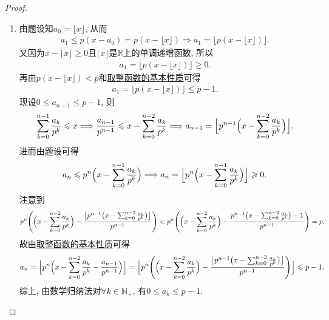 \documentclass[../../main.tex]{subfiles}%
\begin{document}
\begin{proof}
\begin{enumerate}[(1)]
\item 由题设知$a_0=\lfloor x \rfloor$, 从而
\begin{align*}
a_1\leqslant p\left( x-a_0 \right) =p\left( x-\lfloor x \rfloor \right) \Longrightarrow a_1=\lfloor p\left( x-\lfloor x \rfloor \right) \rfloor .
\end{align*}
又因为$x-\lfloor x \rfloor \geqslant 0$且$\lfloor x \rfloor$是$\mathbb{R}$上的单调递增函数, 所以
\begin{align*}
a_1=\lfloor p\left( x-\lfloor x \rfloor \right) \rfloor \geqslant 0.
\end{align*}
再由$p\left( x-\lfloor x \rfloor \right) <p$和\hyperref[proposition:取整函数的基本性质]{取整函数的基本性质}可得
\begin{align*}
a_1=\lfloor p\left( x-\lfloor x \rfloor \right) \rfloor \leqslant p-1.
\end{align*}
现设$0\leqslant a_{n-1}\leqslant p-1$, 则
\begin{align*}
\sum_{k=0}^{n-1}\frac{a_k}{p^k}\leqslant x\Longrightarrow \frac{a_{n-1}}{p^{n-1}}\leqslant x-\sum_{k=0}^{n-2}\frac{a_k}{p^k}\Longrightarrow a_{n-1}=\Bigl\lfloor p^{n-1}\Bigl( x-\sum_{k=0}^{n-2}\frac{a_k}{p^k} \Bigr) \Bigr\rfloor .
\end{align*}
进而由题设可得
\begin{align*}
a_n\leqslant p^n\Bigl( x-\sum_{k=0}^{n-1}\frac{a_k}{p^k} \Bigr) \Longrightarrow a_n=\Bigl\lfloor p^n\Bigl( x-\sum_{k=0}^{n-1}\frac{a_k}{p^k} \Bigr) \Bigr\rfloor \geqslant 0.
\end{align*}
注意到
\begin{align*}
p^n\Biggl( \Bigl( x-\sum_{k=0}^{n-2}\frac{a_k}{p^k} \Bigr) -\frac{\bigl\lfloor p^{n-1}\bigl( x-\sum_{k=0}^{n-2}\frac{a_k}{p^k} \bigr) \bigr\rfloor}{p^{n-1}} \Biggr) <p^n\Biggl( \Bigl( x-\sum_{k=0}^{n-2}\frac{a_k}{p^k} \Bigr) -\frac{p^{n-1}\bigl( x-\sum_{k=0}^{n-2}\frac{a_k}{p^k} \bigr)-1}{p^{n-1}} \Biggr) =p,
\end{align*}
故由\hyperref[proposition:取整函数的基本性质]{取整函数的基本性质}可得
\begin{align*}
a_n=\Bigl\lfloor p^n\Bigl( x-\sum_{k=0}^{n-2}\frac{a_k}{p^k}-\frac{a_{n-1}}{p^{n-1}} \Bigr) \Bigr\rfloor =\Bigl\lfloor p^n\Biggl( \Bigl( x-\sum_{k=0}^{n-2}\frac{a_k}{p^k} \Bigr) -\frac{\bigl\lfloor p^{n-1}\bigl( x-\sum_{k=0}^{n-2}\frac{a_k}{p^k} \bigr) \bigr\rfloor}{p^{n-1}} \Biggr) \Bigr\rfloor \leqslant p-1.
\end{align*}
综上, 由数学归纳法对$\forall k\in \mathbb{N}_+$, 有$0\leqslant a_k\leqslant p-1$.


\end{enumerate}
\end{proof}
\end{document}

